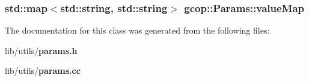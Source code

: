 \subsubsection[{value\-Map}]{\setlength{\rightskip}{0pt plus 5cm}std\-::map$<$std\-::string, std\-::string$>$ {\bf gcop\-::\-Params\-::value\-Map}\hspace{0.3cm}{\ttfamily  [protected]}}\label{classgcop_1_1Params_a99c011f128dcaa426cd98660faa10ecb}


\-The documentation for this class was generated from the following files\-:\begin{DoxyCompactItemize}
\item 
lib/utils/{\bf params.\-h}\item 
lib/utils/{\bf params.\-cc}\end{DoxyCompactItemize}
